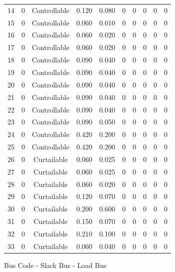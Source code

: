 \begin{longtable}{cccccccccc}
		14 & 0 & Controllable & 0.120 & 0.080 & 0 & 0 & 0 & 0 & 0 \\
		15 & 0 & Controllable & 0.060 & 0.010 & 0 & 0 & 0 & 0 & 0 \\
		16 & 0 & Controllable & 0.060 & 0.020 & 0 & 0 & 0 & 0 & 0 \\
		17 & 0 & Controllable & 0.060 & 0.020 & 0 & 0 & 0 & 0 & 0 \\
		18 & 0 & Controllable & 0.090 & 0.040 & 0 & 0 & 0 & 0 & 0 \\
		19 & 0 & Controllable & 0.090 & 0.040 & 0 & 0 & 0 & 0 & 0 \\
		20 & 0 & Controllable & 0.090 & 0.040 & 0 & 0 & 0 & 0 & 0 \\
		21 & 0 & Controllable & 0.090 & 0.040 & 0 & 0 & 0 & 0 & 0 \\
		22 & 0 & Controllable & 0.090 & 0.040 & 0 & 0 & 0 & 0 & 0 \\
		23 & 0 & Controllable & 0.090 & 0.050 & 0 & 0 & 0 & 0 & 0 \\
		24 & 0 & Controllable & 0.420 & 0.200 & 0 & 0 & 0 & 0 & 0 \\
		25 & 0 & Controllable & 0.420 & 0.200 & 0 & 0 & 0 & 0 & 0 \\
		26 & 0 & Curtailable & 0.060 & 0.025 & 0 & 0 & 0 & 0 & 0 \\
		27 & 0 & Curtailable & 0.060 & 0.025 & 0 & 0 & 0 & 0 & 0 \\
		28 & 0 & Curtailable & 0.060 & 0.020 & 0 & 0 & 0 & 0 & 0 \\
		29 & 0 & Curtailable & 0.120 & 0.070 & 0 & 0 & 0 & 0 & 0 \\
		30 & 0 & Curtailable & 0.200 & 0.600 & 0 & 0 & 0 & 0 & 0 \\
		31 & 0 & Curtailable & 0.150 & 0.070 & 0 & 0 & 0 & 0 & 0 \\
		32 & 0 & Curtailable & 0.210 & 0.100 & 0 & 0 & 0 & 0 & 0 \\
		33 & 0 & Curtailable & 0.060 & 0.040 & 0 & 0 & 0 & 0 & 0 \\
	\bottomrule %
\end{longtable}
\begin{flushleft}
	\item  Bus Code
	 - Slack Bus  - Load Bus
	
\end{flushleft}	

